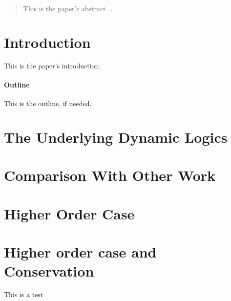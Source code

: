 \documentclass[a4paper,12pt]{article}
\begin{document}
\maketitle

\begin{abstract}
This is the paper's abstract \ldots
\end{abstract}

\section{Introduction}
This is the paper's introduction.



\paragraph{Outline}
This is the outline, if needed.

\section{The Underlying Dynamic Logics}


\section{Comparison With Other Work}

\section{Higher Order Case}


\section{Higher order case and Conservation}

This is a test




\end{document}
